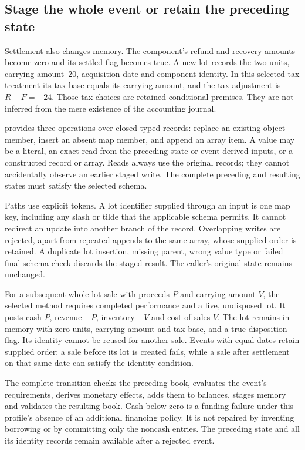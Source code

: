 \subsection{Stage the whole event or retain the preceding state}

Settlement also changes memory. The component's refund and recovery amounts
become zero and its settled flag becomes true. A new lot records the two units,
carrying amount~20, acquisition date and component identity. In this selected
tax treatment its tax base equals its carrying amount, and the tax adjustment
is $R-F=-24$. Those tax choices are retained conditional premises. They are not
inferred from the mere existence of the accounting journal.

 provides three operations over closed typed records:
replace an existing object member, insert an absent map member, and append an
array item. A value may be a literal, an exact read from the preceding state or
event-derived inputs, or a constructed record or array. Reads always use the
original records; they cannot accidentally observe an earlier staged write.
The complete preceding and resulting states must satisfy the selected schema.

Paths use explicit tokens. A lot identifier supplied through an input is one
map key, including any slash or tilde that the applicable schema permits. It
cannot redirect an update into another branch of the record. Overlapping writes
are rejected, apart from repeated appends to the same array, whose supplied
order is retained. A duplicate lot insertion, missing parent, wrong value type
or failed final schema check discards the staged result. The caller's original
state remains unchanged.

For a subsequent whole-lot sale with proceeds $P$ and carrying amount $V$, the
selected method requires completed performance and a live, undisposed lot. It
posts cash $P$, revenue $-P$, inventory $-V$ and cost of sales $V$. The lot remains
in memory with zero units, carrying amount and tax base, and a true disposition
flag. Its identity cannot be reused for another sale. Events with equal dates
retain supplied order: a sale before its lot is created fails, while a sale
after settlement on that same date can satisfy the identity condition.

The complete transition checks the preceding book, evaluates the event's
requirements, derives monetary effects, adds them to balances, stages memory
and validates the resulting book. Cash below zero is a funding failure under
this profile's absence of an additional financing policy. It is not repaired
by inventing borrowing or by committing only the noncash entries. The preceding
state and all its identity records remain available after a rejected event.

